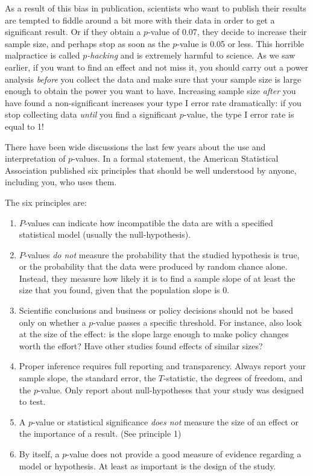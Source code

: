 \documentclass[]{book}\usepackage[]{graphicx}\usepackage[]{color}
\begin{document}
As a result of this bias in publication, scientists who want to publish their results are tempted to fiddle around a bit more with their data in order to get a significant result. Or if they obtain a $p$-value of 0.07, they decide to increase their sample size, and perhaps stop as soon as the $p$-value is 0.05 or less. This horrible malpractice is called \textit{$p$-hacking} and is extremely harmful to science. As we saw earlier, if you want to find an effect and not miss it, you should carry out a power analysis \textit{before} you collect the data and make sure that your sample size is large enough to obtain the power you want to have. Increasing sample size \textit{after} you have found a non-significant  increases your type I error rate dramatically: if you stop collecting data \textit{until} you find a significant $p$-value, the type I error rate is equal to 1!

There have been wide discussions the last few years about the use and interpretation of $p$-values. In a formal statement, the American Statistical Association published six principles that should be well understood by anyone, including you, who uses them.


The six principles are:

\begin{enumerate}

\item
$P$-values can indicate how incompatible the data are with a specified statistical model (usually the null-hypothesis).
\item
$P$-values \textit{do not} measure the probability that the studied hypothesis is true, or the probability that the data were produced by random chance alone. Instead, they measure how likely it is to find a sample slope of at least the size that you found, given that the population slope is 0.
\item
Scientific conclusions and business or policy decisions should not be based only on whether a $p$-value passes a specific threshold. For instance, also look at the size of the effect: is the slope large enough to make policy changes worth the effort? Have other studies found effects of similar sizes?
\item
Proper inference requires full reporting and transparency. Always report your sample slope, the standard error, the $T$-statistic, the degrees of freedom, and the $p$-value. Only report about null-hypotheses that your study was designed to test.
\item
A $p$-value or statistical significance \textit{does not} measure the size of an effect or the importance of a result. (See principle 1)
\item
By itself, a $p$-value does not provide a good measure of evidence regarding a model or hypothesis. At least as important is the design of the study.
\end{enumerate}
\end{document}
